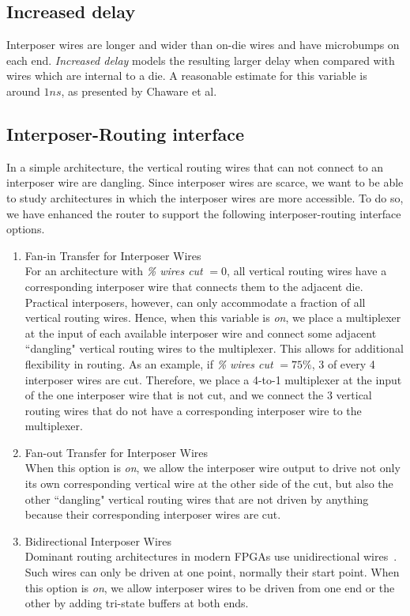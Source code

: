 \documentclass{sig-alternate-2013}
\begin{document}
\subsection{Increased delay}
Interposer wires are longer and wider than on-die wires and have microbumps on each end. \textit{Increased delay} models the resulting larger delay when compared with wires which are internal to a die. A reasonable estimate for this variable is around $1ns$, as presented by Chaware et al\cite{xilinxTSV}.

\subsection{Interposer-Routing interface}
In a simple architecture, the vertical routing wires that can not connect to an interposer wire are dangling. Since interposer wires are scarce, we want to be able to study architectures in which the interposer wires are more accessible. To do so, we have enhanced the router to support the following interposer-routing interface options.

\begin{enumerate}[label=(\alph*)]
\item Fan-in Transfer for Interposer Wires\\
For an architecture with \textit{\% wires cut} $=0$, all vertical routing wires have a corresponding interposer wire that connects them to the adjacent die. Practical interposers, however, can only accommodate a fraction of all vertical routing wires. Hence, when this variable is \textit{on}, we place a multiplexer at the input of each available interposer wire and connect some adjacent ``dangling" vertical routing wires to the multiplexer. This allows for additional flexibility in routing. As an example, if \textit{\% wires cut} $=75\%$, 3 of every 4 interposer wires are cut. Therefore, we place a 4-to-1 multiplexer at the input of the one interposer wire that is not cut, and we connect the 3 vertical routing wires that do not have a corresponding interposer wire to the multiplexer.

\item Fan-out Transfer for Interposer Wires\\
When this option is \textit{on}, we allow the interposer wire output to drive not only its own corresponding vertical wire at the other side of the cut, but also the other ``dangling" vertical routing wires that are not driven by anything because their corresponding interposer wires are cut.

\item Bidirectional Interposer Wires\\
Dominant routing architectures in modern FPGAs use unidirectional wires~\cite{unidirectional, lewis2005stratix}. Such wires can only be driven at one point, normally their start point. When this option is \textit{on}, we allow interposer wires to be driven from one end or the other by adding tri-state buffers at both ends.
\end{enumerate}
\end{document}
